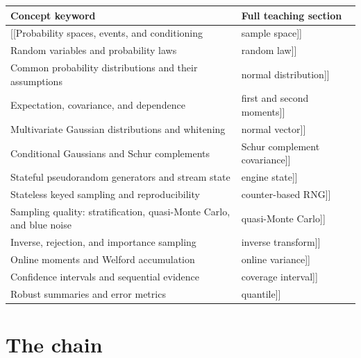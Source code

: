 {\def\LTcaptype{none} %
\begin{longtable}[]{@{}
  >{\raggedright\arraybackslash}p{}
  >{\raggedright\arraybackslash}p{}@{}}
\toprule\noalign{}
\begin{minipage}[b]{\linewidth}\raggedright
Concept keyword
\end{minipage} & \begin{minipage}[b]{\linewidth}\raggedright
Full teaching section
\end{minipage} \\
\midrule\noalign{}
\endhead
\bottomrule\noalign{}
\endlastfoot
{[}{[}Probability spaces, events, and conditioning & sample space{]}{]} \\
{[}{[}Random variables and probability laws & random law{]}{]} \\
{[}{[}Common probability distributions and their assumptions & normal distribution{]}{]} \\
{[}{[}Expectation, covariance, and dependence & first and second moments{]}{]} \\
{[}{[}Multivariate Gaussian distributions and whitening & normal vector{]}{]} \\
{[}{[}Conditional Gaussians and Schur complements & Schur complement covariance{]}{]} \\
{[}{[}Stateful pseudorandom generators and stream state & engine state{]}{]} \\
{[}{[}Stateless keyed sampling and reproducibility & counter-based RNG{]}{]} \\
{[}{[}Sampling quality: stratification, quasi-Monte Carlo, and blue noise & quasi-Monte Carlo{]}{]} \\
{[}{[}Inverse, rejection, and importance sampling & inverse transform{]}{]} \\
{[}{[}Online moments and Welford accumulation & online variance{]}{]} \\
{[}{[}Confidence intervals and sequential evidence & coverage interval{]}{]} \\
{[}{[}Robust summaries and error metrics & quantile{]}{]} \\
\end{longtable}
}

\section{The chain}\label{appendix-cb5af353ef77-the-chain}

